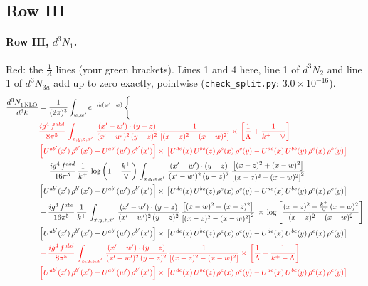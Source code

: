 \documentclass[10pt]{article}
\numberwithin{equation}{section}
\newcommand{\old}[1]{{\color{red}#1}}
\newcommand{\rc}{\color{red}}
\begin{document}
\subsection{Row III}
\paragraph{Row III, $d^3N_1$.}
\old{Red}: the $\frac{1}{\Lambda}$ lines (your green brackets). Lines 1 and 4 here, line 1 of $d^3N_2$ and line 1 of $d^3N_{3a}$ add up to zero exactly, pointwise (\texttt{check\_split.py}: $3.0\times10^{-16}$).
\begin{align}
   \frac{d^{3}N_{1\,\rm NLO}^{\rm}}{d^{3}k}  & =  \frac{1}{(2\pi)^{3}}  \int_{w, w^\prime} e^{-ik(w^\prime-w)}\, \Bigg\{\notag \\
& \rc  \frac{ig^{4}\,f^{abd}}{8\pi^{5}}\,\int_{x,y,z,x'}\, \frac{(x'-w')\cdot (y-z)}{(x'-w')^{2}\,(y-z)^{2}}\, \frac{1}{\left[(x-z)^{2}-(x-w)^{2}\right]}\times\, \left[\frac{1}{\Lambda}+\frac{1}{k^{+}-\vee}\right]\notag \\ & \rc  \left[U^{ab'}(x')\,\rho^{b'}(x')-U^{ab'}(w')\, \rho^{b'}(x')\right]\times\, \left[U^{de}(x)\,U^{bc}(z)\, \rho^{e}(x)\,\rho^{c}(y)-U^{de}(x)\,U^{bc}(y)\,\rho^{e}(x)\,\rho^{c}(y)\right] \notag \\
& -\,\frac{ig^{4}\,f^{abd}}{16\pi^{5}}\,\frac{1}{k^{+}}\,\log{\left(1-\frac{k^{+}}{\vee}\right)}\,\int_{x,y,z,x'}\, \frac{(x'-w')\cdot (y-z)}{(x'-w')^{2}\,(y-z)^{2}}\,\frac{\left[(x-z)^{2}+(x-w)^{2}\right]}{\left[(x-z)^{2}-(x-w)^{2}\right]^{2}}\notag \\ & \left[U^{ab'}(x')\,\rho^{b'}(x')-U^{ab'}(w')\, \rho^{b'}(x')\right]\times\, \left[U^{de}(x)\,U^{bc}(z)\, \rho^{e}(x)\,\rho^{c}(y)-U^{de}(x)\,U^{bc}(y)\,\rho^{e}(x)\,\rho^{c}(y)\right] \notag \\
&  +\frac{ig^{4}\,f^{abd}}{16\pi^{5}}\, \frac{1}{k^{+}}\,\int_{x,y,z,x'}\, \frac{(x'-w')\cdot (y-z)}{(x'-w')^{2}\,(y-z)^{2}}\, \frac{\left[(x-w)^{2}+(x-z)^{2}\right]}{\left[(x-z)^{2}-(x-w)^{2}\right]^{2}}\, \times\, \log{\left[\frac{(x-z)^{2}-\frac{k^{+}}{\vee}\,(x-w)^{2}}{(x-z)^{2}-(x-w)^{2}}\right]}\notag \\ & \left[U^{ab'}(x')\,\rho^{b'}(x')-U^{ab'}(w')\, \rho^{b'}(x')\right]\times\, \left[U^{de}(x)\,U^{bc}(z)\, \rho^{e}(x)\,\rho^{c}(y)-U^{de}(x)\,U^{bc}(y)\,\rho^{e}(x)\,\rho^{c}(y)\right] \notag \\
& \rc   + \frac{ig^{4}\,f^{abd}}{8\pi^{5}}\,\int_{x,y,z,x'}\, \frac{(x'-w')\cdot (y-z)}{(x'-w')^{2}\,(y-z)^{2}}\, \frac{1}{\left[(x-z)^{2}-(x-w)^{2}\right]}\times\, \left[\frac{1}{\Lambda}-\frac{1}{k^{+}-\Lambda}\right]\notag \\ & \rc  \left[U^{ab'}(x')\,\rho^{b'}(x')-U^{ab'}(w')\, \rho^{b'}(x')\right]\times\, \left[U^{de}(x)\,U^{bc}(z)\, \rho^{e}(x)\,\rho^{c}(y)-U^{de}(x)\,U^{bc}(y)\,\rho^{e}(x)\,\rho^{c}(y)\right] \notag \\

\end{align}
\end{document}
